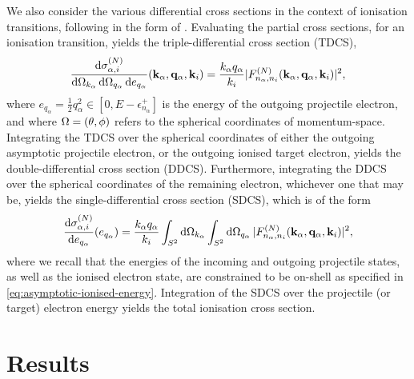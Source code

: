 \documentclass[]{article}
\begin{document}
We also consider the various differential cross sections in the context of
ionisation transitions, following in the form of \cite{PhysRevA.54.2991}.
Evaluating the partial cross sections, for an ionisation transition, yields the
triple-differential cross section (TDCS),
\begin{equation}
  \label{eq:triple-differential-cross-section}
  \dfrac
  {
    \dd{\sigma_{\alpha, i}^{(N)}}
  }
  {
    \dd{\Omega_{k_{\alpha}}}
    \dd{\Omega_{q_{\alpha}}}
    \dd{e_{q_{\alpha}}}
  }
  (
    \vb{k}_{\alpha}, \vb{q}_{\alpha}, \vb{k}_{i}
  )
  =
  \dfrac{k_{\alpha} q_{\alpha}}{k_{i}}
  \lvert
    F_{n_{\alpha}, n_{i}}^{(N)}(
      \vb{k}_{\alpha}, \vb{q}_{\alpha}, \vb{k}_{i}
    )
  \rvert^{2}
  ,
\end{equation}
where $e_{q_{\alpha}} = \tfrac{1}{2} q_{\alpha}^{2} \in [0, E - \epsilon_{n_{\alpha}}^{+}]$ is the energy of the outgoing
projectile electron, and where $\Omega = (\theta, \phi)$ refers to the
spherical coordinates of momentum-space.
Integrating the TDCS over the spherical coordinates of either the outgoing
asymptotic projectile electron, or the outgoing ionised target electron, yields
the double-differential cross section (DDCS).
Furthermore, integrating the DDCS over the spherical coordinates of the
remaining electron, whichever one that may be, yields the single-differential
cross section (SDCS), which is of the form
\begin{equation}
  \label{eq:single-differential-cross-section}
  \dv{\sigma_{\alpha, i}^{\lr{N}}}{e_{q_{\alpha}}}\lr{e_{q_{\alpha}}}
  =
  \dfrac{k_{\alpha} q_{\alpha}}{k_{i}}
  \int_{S^{2}}
  \dd{\Omega_{k_{\alpha}}}
  \int_{S^{2}}
  \dd{\Omega_{q_{\alpha}}}
  \lrabs
  {
    F_{n_{\alpha}, n_{i}}^{\lr{N}}\lr
    {
      \vb{k}_{\alpha}, \vb{q}_{\alpha}, \vb{k}_{i}
    }
  }^{2}
  ,
\end{equation}
where we recall that the energies of the incoming and outgoing projectile
states, as well as the ionised electron state, are constrained to be on-shell as
specified in \eqref{eq:asymptotic-ionised-energy}.
Integration of the SDCS over the projectile (or target) electron energy yields
the total ionisation cross section.

\section{Results}
\label{sec:re}

\end{document}
